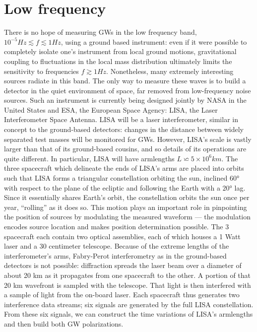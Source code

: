 \documentclass[binding=0.6cm, LaM]{sapthesis}
\begin{document}
\section{Low frequency}
There is no hope of measuring GWs in the low frequency band, $10^{-5} Hz \apprle f \apprle 1 Hz$, using a ground based instrument: even if it were possible to completely isolate one’s instrument from
local ground motions, gravitational coupling to fluctuations in the local mass distribution ultimately limits the sensitivity to frequencies $f \apprge 1 Hz$.
Nonetheless, many extremely interesting sources radiate in this band.
The only way to measure these waves is to build a detector in the quiet environment of space, far removed from low-frequency noise sources.
Such an instrument is currently being designed jointly by NASA in the United States and ESA, the European Space Agency: LISA, the Laser Interferometer Space Antenna. LISA will be a laser
interferometer, similar in concept to the ground-based detectors: changes in the distance between widely separated test masses will be monitored for GWs.
However, LISA’s scale is vastly larger than that of its ground-based cousins, and so details of its operations are quite different.
In particular, LISA will have armlengths $L \backsimeq 5 \times 10^6 km$. The three spacecraft which delineate the ends of LISA’s arms are placed into orbits such that LISA forms a triangular
constellation orbiting the sun, inclined $\ang{60}$ with respect to the plane of the ecliptic and following the Earth with a $\ang{20}$ lag.
Since it essentially shares Earth’s orbit, the constellation orbits the sun once per year, “rolling” as it does so.
This motion plays an important role in pinpointing the position of sources by modulating the measured waveform — the modulation encodes source location and makes position determination possible.
The 3 spacecraft each contain two optical assemblies, each of which houses a 1 Watt laser and a 30 centimeter telescope.
 Because of the extreme lengths of the interferometer’s arms, Fabry-Perot interferometry as in the ground-based detectors is not possible:
diffraction spreads the laser beam over a diameter of about 20 km as it propagates from one spacecraft to the other. A portion of that 20 km wavefront is sampled with the telescope.
That light is then interfered with a sample of light from the on-board laser. Each spacecraft thus generates two interference data streams; six signals are generated by the full LISA constellation.
From these six signals, we can construct the time variations of LISA’s armlengths and then build both GW polarizations.
\end{document}
